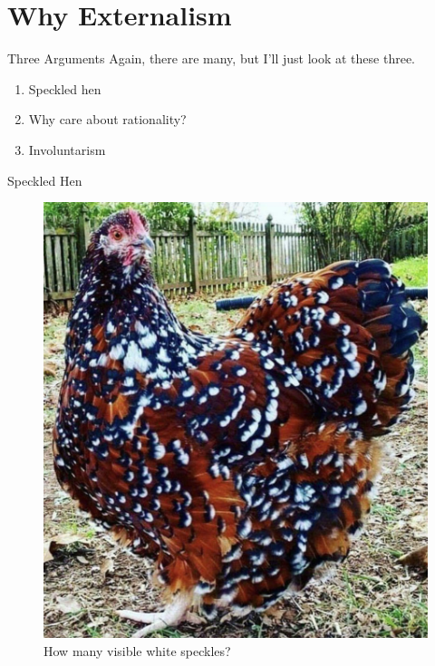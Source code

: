 \documentclass[
  17pt,
  letterpaper,
  ignorenonframetext,
  aspectratio=169,
  handout]{beamer}
\providecommand{\tightlist}{%
  \setlength{\itemsep}{0pt}\setlength{\parskip}{0pt}}\usepackage{longtable,booktabs,array}
\begin{document}
\hypertarget{why-externalism}{%
\section{Why Externalism}\label{why-externalism}}

\begin{frame}{Three Arguments}
\protect\hypertarget{three-arguments}{}
Again, there are many, but I'll just look at these three.

\begin{enumerate}[<+->]
\tightlist
\item
  Speckled hen
\item
  Why care about rationality?
\item
  Involuntarism
\end{enumerate}
\end{frame}

\begin{frame}{Speckled Hen}
\protect\hypertarget{speckled-hen}{}
\begin{figure}

{\centering \includegraphics[width=\textwidth,height=0.6\textheight]{../images/hen.jpg}

}

\caption{How many visible white speckles?}

\end{figure}
\end{frame}
\end{document}
